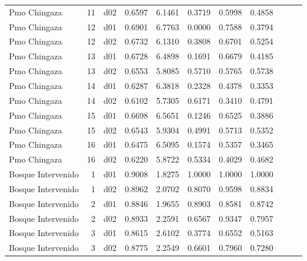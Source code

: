 \begin{landscape}
\begin{longtable}{p{2cm}rrrrrrrrrr}
            Pmo Chingaza  &         11 &     d02 &   0.6597 &  6.1461 &        0.3719 &           0.5998 &  0.4858 \\
            Pmo Chingaza  &         12 &     d01 &   0.6901 &  6.7763 &        0.0000 &           0.7588 &  0.3794 \\
            Pmo Chingaza  &         12 &     d02 &   0.6732 &  6.1310 &        0.3808 &           0.6701 &  0.5254 \\
            Pmo Chingaza  &         13 &     d01 &   0.6728 &  6.4898 &        0.1691 &           0.6679 &  0.4185 \\
            Pmo Chingaza  &         13 &     d02 &   0.6553 &  5.8085 &        0.5710 &           0.5765 &  0.5738 \\
            Pmo Chingaza  &         14 &     d01 &   0.6287 &  6.3818 &        0.2328 &           0.4378 &  0.3353 \\
            Pmo Chingaza  &         14 &     d02 &   0.6102 &  5.7305 &        0.6171 &           0.3410 &  0.4791 \\
            Pmo Chingaza  &         15 &     d01 &   0.6698 &  6.5651 &        0.1246 &           0.6525 &  0.3886 \\
            Pmo Chingaza  &         15 &     d02 &   0.6543 &  5.9304 &        0.4991 &           0.5713 &  0.5352 \\
            Pmo Chingaza  &         16 &     d01 &   0.6475 &  6.5095 &        0.1574 &           0.5357 &  0.3465 \\
            Pmo Chingaza  &         16 &     d02 &   0.6220 &  5.8722 &        0.5334 &           0.4029 &  0.4682 \\
    Bosque Intervenido    &          1 &     d01 &   0.9008 &  1.8275 &        1.0000 &           1.0000 &  1.0000 \\
    Bosque Intervenido    &          1 &     d02 &   0.8962 &  2.0702 &        0.8070 &           0.9598 &  0.8834 \\
    Bosque Intervenido    &          2 &     d01 &   0.8846 &  1.9655 &        0.8903 &           0.8581 &  0.8742 \\
    Bosque Intervenido    &          2 &     d02 &   0.8933 &  2.2591 &        0.6567 &           0.9347 &  0.7957 \\
    Bosque Intervenido    &          3 &     d01 &   0.8615 &  2.6102 &        0.3774 &           0.6552 &  0.5163 \\
    Bosque Intervenido    &          3 &     d02 &   0.8775 &  2.2549 &        0.6601 &           0.7960 &  0.7280 \\

\end{longtable}
\end{landscape}
